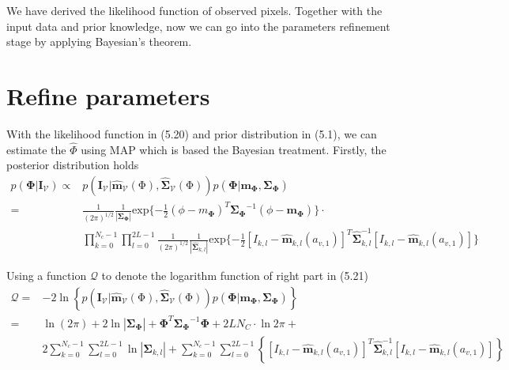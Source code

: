 We have derived the likelihood function of observed pixels. Together
with the input data and prior knowledge, now we can go into the parameters
refinement stage by applying Bayesian's theorem.

\section{Refine parameters}
\label{sec:ref}

With the likelihood function in (5.20) and prior distribution in
(5.1), we can estimate the $\hat{\Phi}$ using MAP which is based the
Bayesian treatment.
Firstly, the posterior distribution holds
\begin{align}
    p(\mathbf{\Phi}|\mathbf{\mathbf{I}}_{\mathcal{V}}) 
    \propto &
    p(\mathbf{\mathbf{I}_{\mathcal{V}}}
    |\hat{\mathbf{\mathbf{m}}}_{\mathcal{V}}(\mathrm{\Phi}),\hat{\mathbf{\mathbf{\Sigma}}}_{\mathcal{V}}(\mathrm{\Phi}))p(\mathbf{\Phi}
    | \mathbf{m}_{\mathbf{\Phi}},
    \mathbf{\mathbf{\Sigma}}_{\mathbf{\Phi}})\nonumber\\
    = & {\frac{1}{{(2\pi)}^{1/2}}}
      \frac{1}{|\mathbf{\Sigma}_{\mathbf{\Phi}}|}
      \mathrm{exp}\{-\frac{1}{2}{(\phi-m_{\mathbf{\Phi}})^T{\mathbf{\Sigma}_{\mathbf{\Phi}}}^{-1}(\phi-\mathbf{m}_{\mathbf{\Phi}})}\}\cdot
    \nonumber\\ 
    & \prod_{k = 0}^{N_{c}-1} \prod_{l=0}^{2L-1}{\frac{1}{(2\pi)^{1/2}}
        \frac{1}{|\hat{\mathbf{\Sigma}}_{k,l}|} \mathrm{exp}\{-\frac{1}{2}
        {\left[I_{k,l}-\hat{\mathbf{m}}_{k,l}(a_{v,1})\right]^T\hat{\mathbf{\Sigma}}_{k,l}^{-1}\left[I_{k,l}-\hat{\mathbf{m}}_{k,l}(a_{v,1})\right]}
      }\}
\end{align}

Using a function $\mathcal{Q}$ to denote the logarithm function
of right part in (5.21)
\begin{align}
  \label{eq:5.22}
  \mathcal{Q} = & -2 \ln \left\{  p(\mathbf{\mathbf{I}_{\mathcal{V}}}
    |\hat{\mathbf{\mathbf{m}}}_{\mathcal{V}}(\mathrm{\Phi}),\hat{\mathbf{\mathbf{\Sigma}}}_{\mathcal{V}}(\mathrm{\Phi}))p(\mathbf{\Phi}
    | \mathbf{m}_{\mathbf{\Phi}},
    \mathbf{\mathbf{\Sigma}}_{\mathbf{\Phi}})\right\}\nonumber\\
 = & \ln{(2\pi)} + 2\ln{|\mathbf{\Sigma}_{\mathbf{\Phi}}|} +
 {\mathbf{\Phi}}^T{\mathbf{\Sigma}_{\mathbf{\Phi}}}^{-1}\mathbf{\Phi}
 + 2LN_{C} \cdot \ln{2\pi} + \nonumber \\
& 2\sum_{k = 0}^{N_{c}-1} \sum_{l=0}^{2L-1}{\ln{|\mathbf{\Sigma}_{k,l}|}} + \sum_{k = 0}^{N_{c}-1} \sum_{l=0}^{2L-1}
\left\{{\left[I_{k,l}-\hat{\mathbf{m}}_{k,l}(a_{v,1})\right]^T\hat{\mathbf{\Sigma}}_{k,l}^{-1}\left[I_{k,l}-\hat{\mathbf{m}}_{k,l}(a_{v,1})\right]}\right\}
\end{align}

